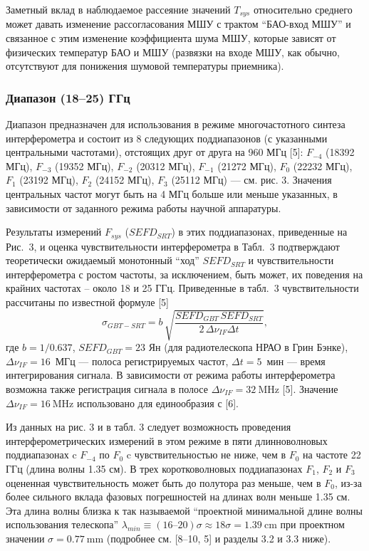 Заметный вклад в наблюдаемое рассеяние значений $T_{sys}$ относительно среднего может давать
изменение рассогласования МШУ с трактом ``БАО-вход МШУ'' и связанное с этим изменение коэффициента
шума МШУ, которые зависят от физических температур БАО и МШУ (развязки на входе МШУ, как обычно,
отсутствуют для понижения шумовой температуры приемника).

\subsubsection{Диапазон (18--25) ГГц}

Диапазон предназначен для использования в режиме многочастотного
синтеза интерферометра и состоит из 8 следующих поддиапазонов
(с указанными центральными частотами), отстоящих
друг от друга на 960 МГц [5]: $F_{-4}$ (18392 МГц), $F_{-3}$ (19352
МГц), $F_{-2}$ (20312 МГц), $F_{-1}$ (21272 МГц), $F_0$ (22232 МГц),
$F_1$ (23192 МГц),  $F_2$ (24152 МГц), $F_3$ (25112 МГц) --- см. рис. 3. Значения центральных частот
могут быть на 4 МГц больше или меньше указанных, в
зависимости от заданного режима работы научной аппаратуры.

Результаты измерений $F_{sys}$ ($SEFD_{SRT}$) в этих поддиапазонах,
приведенные на Рис.~3, и оценка чувствительности интерферометра в Табл.~3
подтверждают теоретически ожидаемый монотонный ``ход'' $SEFD_{SRT}$ и чувствительности
интерферометра с ростом частоты, за исключением, быть может, их поведения
на крайних частотах -- около 18 и 25 ГГц.
Приведенные в табл.~3 чувствительности  рассчитаны по известной формуле [5]
$$
\sigma_{GBT-SRT} = b\, \sqrt{\frac {SEFD_{GBT}\, SEFD_{SRT}}{2\, \Delta \nu_{IF} \Delta t}},
$$
\noindent
где $b = 1/0.637$, $SEFD_{GBT} = 23$ Ян (для радиотелескопа НРАО в Грин Бэнке),
$\Delta \nu_{IF} = 16$~МГц --- полоса регистрируемых частот, $\Delta t = 5$~мин ---
время интегрирования сигнала. В зависимости от режима
работы интерферометра возможна также регистрация сигнала в полосе $\Delta\nu_{IF} = \SI{32}{\MHz}$
[5]. Значение $\Delta\nu_{IF} = \SI{16}{\MHz}$ использовано для единообразия с [6].

Из данных на рис. 3 и в табл. 3 следует возможность проведения интерферометрических измерений в этом
режиме в пяти длинноволновых
поддиапазонах c $F_{-4}$ по $F_0$ c чувствительностью не ниже, чем в $F_0$ на частоте 22 ГГц (длина
волны 1.35 см).
В трех коротковолновых поддиапазонах $F_1$, $F_2$ и $F_3$ оцененная
чувствительность может быть до полутора раз меньше, чем в $F_0$, из-за более сильного
вклада фазовых погрешностей на длинах волн
меньше 1.35 см. Эта длина волны близка к так называемой ``проектной минимальной длине волны
использования телескопа'' $\lambda_{min} \equiv (16\text{--}20)\sigma \approx 18\sigma=
\SI{1.39}{\cm}$ при проектном значении $\sigma = \SI{0.77}{\mm}$
(подробнее см. [8--10, 5] и разделы 3.2 и 3.3 ниже).

